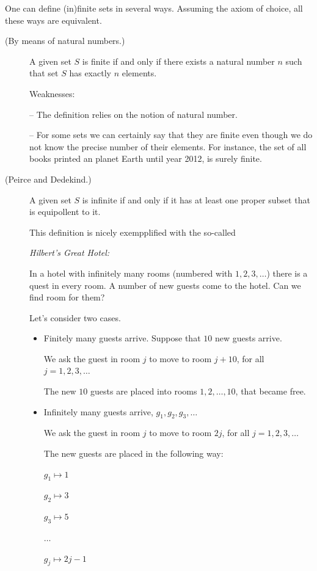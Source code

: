 \documentclass[11pt,paper=b5,footinclude,headinclude]{scrbook} %
\theoremstyle{remark}
\theoremstyle{definition} %
\theoremstyle{theorem} %
\begin{document}
One can define (in)finite sets in several ways. Assuming the axiom of choice, all these ways are equivalent.

\begin{description}
  \item[(By means of natural numbers.)] A given set $S$ is finite if and only if there exists a natural number $n$ such that set $S$ has exactly $n$ elements.

      Weaknesses:

      -- The definition relies on the notion of natural number.

      -- For some sets we can certainly say that they are finite even though we do not know the precise number of their elements.
      For instance, the set of all books printed an planet Earth until year 2012, is surely finite.

  \item[(Peirce and Dedekind.)] A given set $S$ is infinite if and only if it has at least one proper subset that is equipollent to it.

  \medskip
  This definition is nicely exempplified with the so-called~{\em Hilbert's Great Hotel:

  In a hotel with infinitely many rooms (numbered with $1,2,3,\ldots$) there is a quest in every room.
  A number of new guests come to the hotel. Can we find room for them?}

 Let's consider two cases.
 \begin{itemize}
  \item {Finitely many guests arrive.} Suppose that $10$ new guests arrive.

  We ask the guest in room $j$ to move to room $j+10$, for all $j = 1,2,3,\ldots$

  The new $10$ guests are placed into rooms $1,2,\ldots, 10$, that became free.

  \item {Infinitely many guests arrive, $g_1, g_2, g_3,\ldots$}

  We ask the guest in room $j$ to move to room $2j$, for all $j = 1,2,3,\ldots$

  The new guests are placed in the following way:

  $g_1\mapsto 1$

  $g_2\mapsto 3$

  $g_3\mapsto 5$

  $\ldots$

  $g_j\mapsto 2j-1$
\end{itemize}



\end{description}
\end{document}
